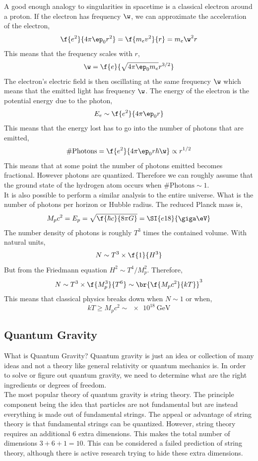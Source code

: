 \documentclass{article}
\begin{document}
A good enough analogy to singularities in spacetime is a classical electron around a proton. If the electron has frequency $\w$, we can approximate the acceleration of the electron,
\[ \f{e^2}{4 \pi \ep_0 r^2} = \f{m_e v^2}{r} = m_e \w^2 r \]
This means that the frequency scales with $r$,
\[ \w = \f{e}{\sqrt{4 \pi \ep_0 m_e } r^{3/2}} \]
The electron's electric field is then oscillating at the same frequency $\w$ which means that the emitted light has frequency $\w$. The energy of the electron is the potential energy due to the photon,
\[ E_e \sim \f{e^2}{4 \pi \ep_0 r} \]
This means that the energy lost has to go into the number of photons that are emitted,
\[ \# \text{Photons} = \f{e^2}{4 \pi \ep_0 r \hbar \w} \propto r^{1/2} \]
This means that at some point the number of photons emitted becomes fractional. However photons are quantized. Therefore we can roughly assume that the ground state of the hydrogen atom occurs when $\# \text{Photons} \sim 1$. \\

It is also possible to perform a similar analysis to the entire universe. What is the number of photons per horizon or Hubble radius. The reduced Planck mass is,
\[ M_p c^2 = E_p = \sqrt{\f{\hbar c}{8 \pi G}} = \SI{e18}{\giga \eV} \]
The number density of photons is roughly $T^3$ times the contained volume. With natural units,
\[ N \sim T^3 \times \f{1}{H^3} \]
But from the Friedmann equation $H^2 \sim T^4 / M_p^2$. Therefore,
\[ N \sim T^3 \times \f{M_p^3}{T^6} \sim \br{\f{M_p c^2}{k T}}^3 \]
This means that classical physics breaks down when $N \sim 1$ or when,
\[ kT \geq M_p c^2 \sim \SI{e18}{\giga \eV} \]

\subsection{Quantum Gravity}

What is Quantum Gravity? Quantum gravity is just an idea or collection of many ideas and not a theory like general relativity or quantum mechanics is. In order to solve or figure out quantum gravity, we need to determine what are the right ingredients or degrees of freedom. \\

The most popular theory of quantum gravity is string theory. The principle component being the idea that particles are not fundamental but are instead everything is made out of fundamental strings. The appeal or advantage of string theory is that fundamental strings can be quantized. However, string theory requires an additional $6$ extra dimensions. This makes the total number of dimensions $3 + 6 + 1 = 10$. This can be considered a failed prediction of string theory, although there is active research trying to hide these extra dimensions.\\
\end{document}
